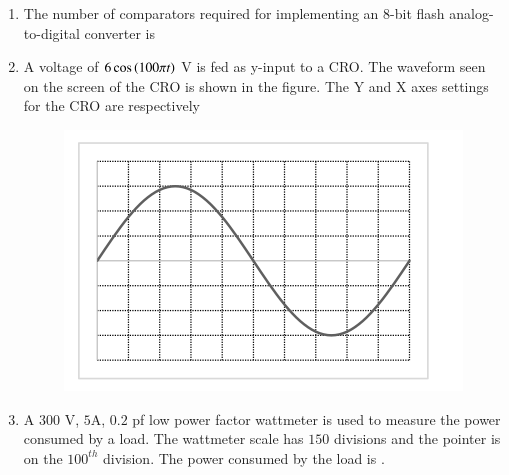 \documentclass[journal,12pt,onecolumn]{IEEEtran}
\theoremstyle{remark}
\begin{document}
\begin{enumerate}
    \item The number of comparators required for implementing an 8-bit flash analog-to-digital converter is
    
    \hfill{}
    \begin{enumerate}
    \end{enumerate}

    \item A voltage of $6\cos\left(100\pi t\right)$ V is fed as y-input to a CRO. The waveform seen on the screen of the CRO is shown in the figure. The Y and X axes settings for the CRO are respectively
    \begin{figure}[H]
        \centering
        \includegraphics[width=0.6\columnwidth]{q20.png}
        \caption*{}
        \label{fig:q20}
    \end{figure}
    
    \hfill{}
    \begin{enumerate}
    \end{enumerate}

    \item A $300$ V, $5$A, $0.2$ pf low power factor wattmeter is used to measure the power consumed by a load. The wattmeter scale has $150$ divisions and the pointer is on the $100^{th}$ division. The power consumed by the load  is \underline{\hspace{2cm}}.
    

\end{enumerate}
\end{document}
